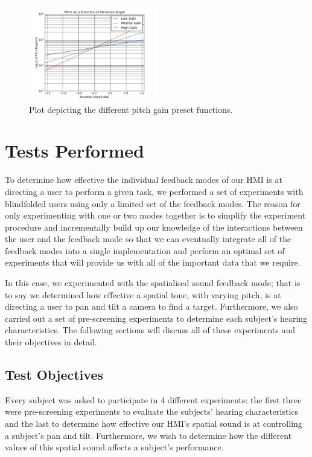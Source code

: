 \documentclass[format=sigconf, review=true, screen=true, anonymous=true]{acmart}
\begin{document}
\begin{figure}
  \centering
  \includegraphics[width=0.5\textwidth]{figures/pitch_gradient.pdf}
  \caption{Plot depicting the different pitch gain preset functions.}
  \label{fig:pitch-preset-plot}
\end{figure}

\section{Tests Performed}

To determine how effective the individual feedback modes of our HMI is at directing a user to perform a given task, we performed a set of experiments with blindfolded users using only a limited set of the feedback modes. The reason for only experimenting with one or two modes together is to simplify the experiment procedure and incrementally build up our knowledge of the interactions between the user and the feedback mode so that we can eventually integrate all of the feedback modes into a single implementation and perform an optimal set of experiments that will provide us with all of the important data that we require. 

In this case, we experimented with the spatialised sound feedback mode; that is to say we determined how effective a spatial tone, with varying pitch, is at directing a user to pan and tilt a camera to find a target. Furthermore, we also carried out a set of pre-screening experiments to determine each subject's hearing characteristics. The following sections will discuss all of these experiments and their objectives in detail. 

\subsection{Test Objectives}

Every subject was asked to participate in 4 different experiments: the first three were pre-screening experiments to evaluate the subjects' hearing characteristics and the last to determine how effective our HMI's spatial sound is at controlling a subject's pan and tilt. Furthermore, we wish to determine how the different values of this spatial sound affects a subject's performance. 
\end{document}
